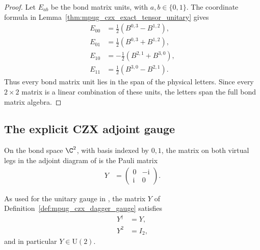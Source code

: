 \begin{proof}\leanok
    Let $E_{ab}$ be the bond matrix units, with $a,b\in\{0,1\}$.
    The coordinate formula in
    Lemma~\ref{thm:mpug_czx_exact_tensor_unitary} gives
    \begin{align}
        E_{00}
         & =\tfrac12(B^{0,3}-B^{1,2}),  \\
        E_{01}
         & =\tfrac12(B^{0,3}+B^{1,2}),  \\
        E_{10}
         & =-\tfrac12(B^{2,1}+B^{3,0}), \\
        E_{11}
         & =\tfrac12(B^{3,0}-B^{2,1}).
    \end{align}
    Thus every bond matrix unit lies in the span of the physical letters.
    Since every $2\times2$ matrix is a linear combination of these units,
    the letters span the full bond matrix algebra.
\end{proof}

\subsection{The explicit CZX adjoint gauge}

\begin{definition}
    \label{def:mpug_czx_dagger_gauge}
    \leanok
    On the bond space $\C^2$, with basis indexed by $0,1$, the matrix on
    both virtual legs in the adjoint diagram of
    \cite[lines~4547--4559]{FrancoRubio2025MPUGauging} is the Pauli matrix
    \begin{align}
        Y & =\begin{pmatrix}0&-\mathrm{i}\\ \mathrm{i}&0\end{pmatrix}.
    \end{align}
\end{definition}

\begin{lemma}
    \label{thm:mpug_czx_dagger_gauge_laws}
    \leanok
    As used for the unitary gauge in
    \cite[lines~4547--4559]{FrancoRubio2025MPUGauging}, the matrix $Y$ of
    Definition~\ref{def:mpug_czx_dagger_gauge} satisfies
    \begin{align}
        Y^\dagger & =Y,   \\
        Y^2       & =I_2,
    \end{align}
    and in particular $Y\in\mathrm{U}(2)$.
\end{lemma}

